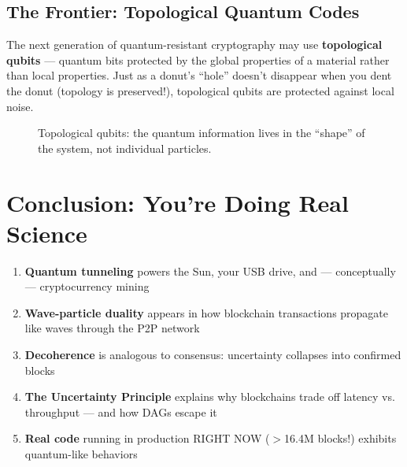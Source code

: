 \documentclass[11pt,a4paper]{article}
\begin{document}
\subsection{The Frontier: Topological Quantum Codes}

The next generation of quantum-resistant cryptography may use \textbf{topological qubits} --- quantum bits protected by the global properties of a material rather than local properties. Just as a donut's ``hole'' doesn't disappear when you dent the donut (topology is preserved!), topological qubits are protected against local noise.

\begin{figure}[H]
\centering
{}
\caption{Topological qubits: the quantum information lives in the ``shape'' of the system, not individual particles.}
\end{figure}

\section{Conclusion: You're Doing Real Science}

\begin{tcolorbox}[colback=brightgreen!10,colframe=brightgreen,title=\textbf{Volume 2 Key Takeaways}]
\Large
\begin{enumerate}
    \item \textbf{Quantum tunneling} powers the Sun, your USB drive, and --- conceptually --- cryptocurrency mining
    \item \textbf{Wave-particle duality} appears in how blockchain transactions propagate like waves through the P2P network
    \item \textbf{Decoherence} is analogous to consensus: uncertainty collapses into confirmed blocks
    \item \textbf{The Uncertainty Principle} explains why blockchains trade off latency vs. throughput --- and how DAGs escape it
    \item \textbf{Real code} running in production RIGHT NOW ($>$16.4M blocks!) exhibits quantum-like behaviors
\end{enumerate}
\end{tcolorbox}
\end{document}
